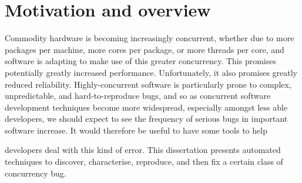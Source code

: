 \section{Motivation and overview}
\label{sect:intro:overview}

Commodity hardware is becoming increasingly concurrent, whether due to
more packages per machine, more cores per package, or more threads per
core, and software is adapting to make use of this greater
concurrency.  This promises potentially greatly increased performance.
Unfortunately, it also promises greatly reduced reliability.
Highly-concurrent software is particularly prone to complex,
unpredictable, and hard-to-reproduce bugs, and so as concurrent
software development techniques become more widespread, especially
amongst less able developers, we should expect to see the frequency of
serious bugs in important software increase.  It would therefore be
useful to have some tools to help
developers deal with this kind of
error.  This dissertation presents automated techniques to discover,
characterise, reproduce, and then fix a certain class of concurrency
bug.

